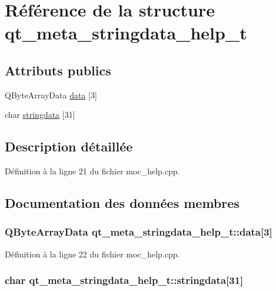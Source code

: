 \hypertarget{structqt__meta__stringdata__help__t}{\section{Référence de la structure qt\-\_\-meta\-\_\-stringdata\-\_\-help\-\_\-t}
\label{structqt__meta__stringdata__help__t}
}
\subsection*{Attributs publics}
\begin{DoxyCompactItemize}
\item 
Q\-Byte\-Array\-Data \hyperlink{structqt__meta__stringdata__help__t_ab0655fba11cbbde1945517b2781855ad}{data} \mbox{[}3\mbox{]}
\item 
char \hyperlink{structqt__meta__stringdata__help__t_a54f88cd0f148fbec1b73a14ffd87a6a0}{stringdata} \mbox{[}31\mbox{]}
\end{DoxyCompactItemize}


\subsection{Description détaillée}


Définition à la ligne 21 du fichier moc\-\_\-help.\-cpp.



\subsection{Documentation des données membres}
\hypertarget{structqt__meta__stringdata__help__t_ab0655fba11cbbde1945517b2781855ad}{
\subsubsection[{data}]{\setlength{\rightskip}{0pt plus 5cm}Q\-Byte\-Array\-Data qt\-\_\-meta\-\_\-stringdata\-\_\-help\-\_\-t\-::data\mbox{[}3\mbox{]}}}\label{structqt__meta__stringdata__help__t_ab0655fba11cbbde1945517b2781855ad}


Définition à la ligne 22 du fichier moc\-\_\-help.\-cpp.

\hypertarget{structqt__meta__stringdata__help__t_a54f88cd0f148fbec1b73a14ffd87a6a0}{
\subsubsection[{stringdata}]{\setlength{\rightskip}{0pt plus 5cm}char qt\-\_\-meta\-\_\-stringdata\-\_\-help\-\_\-t\-::stringdata\mbox{[}31\mbox{]}}}\label{structqt__meta__stringdata__help__t_a54f88cd0f148fbec1b73a14ffd87a6a0}


